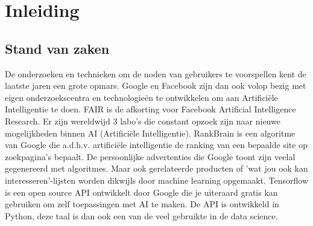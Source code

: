 
\chapter{Inleiding}
\label{ch:inleiding}




\section{Stand van zaken}
\label{sec:stand-van-zaken}



De onderzoeken en technieken om de noden van gebruikers te voorspellen kent de laatste jaren een grote opmars. Google en Facebook zijn dan ook volop bezig met eigen onderzoekscentra en technologieën te ontwikkelen om aan Artificiële Intelligentie te doen. FAIR is de afkorting voor Facebook Artificial Intelligence Research. Er zijn wereldwijd 3 labo's die constant opzoek zijn naar nieuwe mogelijkheden binnen AI (Artificiële Intelligentie). RankBrain is een algoritme van Google die a.d.h.v. artificiële intelligentie de ranking van een bepaalde site op zoekpagina's bepaalt.
De persoonlijke advertenties die Google toont zijn veelal gegenereerd met algoritmes.  Maar ook gerelateerde producten of 'wat jou ook kan interesseren'-lijsten worden dikwijls door machine learning opgemaakt. Tensorflow \autocite{tensorflow} is een open source API ontwikkelt door Google die je uiteraard gratis kan gebruiken om zelf toepassingen met AI te maken. De API is ontwikkeld in Python, deze taal is dan ook een van de veel gebruikte in de data science\autocite{pythonMostPopular}.

